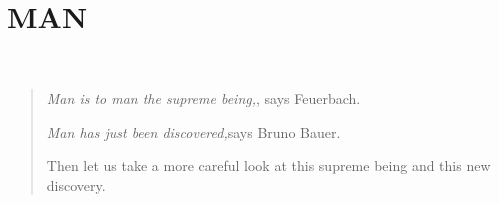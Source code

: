 \chapter[Part First: Man]{\\
MAN}

\newpage{}

~

\vspace{200pt}

\begin{quote}

\textit{Man is to man the supreme being,}, says Feuerbach.

\textit{Man has just been discovered,}says Bruno Bauer.

Then let us take a more careful look at this supreme being and this new 
discovery.

\end{quote}

\medskip{}
